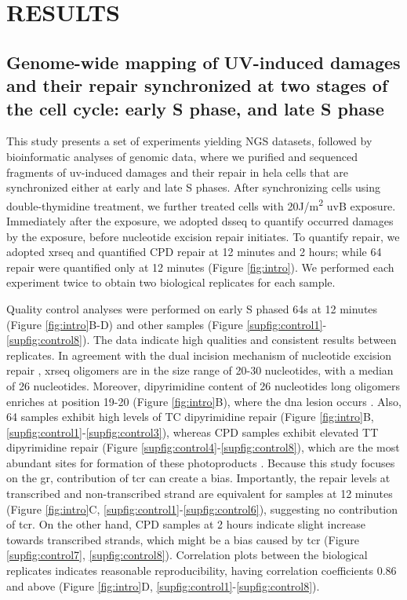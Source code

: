 \setlength{\parindent}{0pt}
\chapter{\bf RESULTS}

\section{Genome-wide mapping of UV-induced damages and their repair synchronized at two stages of the cell cycle: early S phase, and late S phase}

This study presents a set of experiments yielding NGS datasets, followed by bioinformatic analyses of genomic data, where we purified and sequenced fragments of \gls{uv}-induced damages and their repair in \gls{hela} cells that are synchronized either at early and late S phases. After synchronizing cells using double-thymidine treatment, we further treated cells with 20J/m\textsuperscript{2} \gls{uv}B exposure. Immediately after the exposure, we adopted \gls{dsseq} to quantify occurred damages by the exposure, before nucleotide excision repair initiates. To quantify repair, we adopted \gls{xrseq} and quantified \gls{CPD} repair at 12 minutes and 2 hours; while \gls{64} repair were quantified only at 12 minutes (Figure \ref{fig:intro}). We performed each experiment twice to obtain two biological replicates for each sample. 

Quality control analyses were performed on early S phased \gls{64}s at 12 minutes (Figure \ref{fig:intro}B-D) and other samples (Figure \ref{supfig:control1}-\ref{supfig:control8}). The data indicate high qualities and consistent results between replicates. In agreement with the dual incision mechanism of nucleotide excision repair \citep{huang1992human,li2017human,reardon2005nucleotide}, \gls{xrseq} oligomers are in the size range of 20-30 nucleotides, with a median of 26 nucleotides. Moreover, dipyrimidine content of 26 nucleotides long oligomers enriches at position 19-20 (Figure \ref{fig:intro}B), where the \gls{dna} lesion occurs \citep{huang1992human}. Also, \gls{64} samples exhibit high levels of \gls{T}\gls{C} dipyrimidine repair (Figure \ref{fig:intro}B, \ref{supfig:control1}-\ref{supfig:control3}), whereas \gls{CPD} samples exhibit elevated \gls{T}\gls{T} dipyrimidine repair (Figure \ref{supfig:control4}-\ref{supfig:control8}), which are the most abundant sites for formation of these photoproducts \citep{mouret2010uva}. Because this study focuses on the \gls{gr}, contribution of \gls{tcr} can create a bias. Importantly, the repair levels at transcribed and non-transcribed strand are equivalent for samples at 12 minutes (Figure \ref{fig:intro}C, \ref{supfig:control1}-\ref{supfig:control6}), suggesting no contribution of \gls{tcr}. On the other hand, \gls{CPD} samples at 2 hours indicate slight increase towards transcribed strands, which might be a bias caused by \gls{tcr} (Figure \ref{supfig:control7}, \ref{supfig:control8}). Correlation plots between the biological replicates indicates reasonable reproducibility, having correlation coefficients 0.86 and above (Figure \ref{fig:intro}D, \ref{supfig:control1}-\ref{supfig:control8}). 

